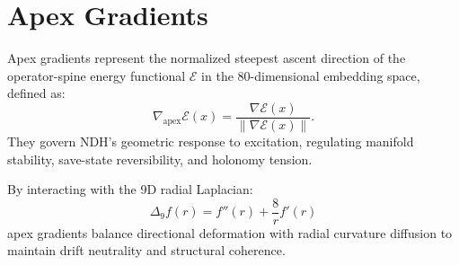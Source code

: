 \section{Apex Gradients}
\label{sec:apex-gradients}

Apex gradients represent the
normalized steepest ascent
direction of the operator-spine
energy functional $\mathcal{E}$
in the 80-dimensional
embedding space, defined as:
\[
\nabla_{\mathrm{apex}} \mathcal{E}(x)
= \frac{\nabla \mathcal{E}(x)}
{\|\nabla \mathcal{E}(x)\|}.
\]
They govern NDH's geometric
response to excitation,
regulating manifold stability,
save-state reversibility,
and holonomy tension.

By interacting with the 9D
radial Laplacian:
\[
\Delta_9 f(r)
= f''(r) + \frac{8}{r} f'(r)
\]
apex gradients balance
directional deformation
with radial curvature diffusion
to maintain drift neutrality
and structural coherence.
